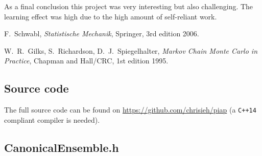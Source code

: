 \documentclass[11pt, a4paper]{article}
\numberwithin{equation}{section}
\begin{document}
As a final conclusion this project was very interesting but also challenging.
The learning effect was high due to the high amount of self-reliant work.

\FloatBarrier
\vspace{\fill}
\begin{thebibliography}{9}
	F.\ Schwabl,
	\emph{Statistische Mechanik},
	Springer, 3rd edition 2006.

	W.\ R.\ Gilks, S.\ Richardson, D.\ J.\ Spiegelhalter,
	\emph{Markov Chain Monte Carlo in Practice},
	Chapman and Hall/CRC, 1st edition 1995.
\end{thebibliography}

\begin{appendix}
	\newpage
	\section{Source code}
	The full source code can be found on \url{https://github.com/chrisieh/piap} (a \texttt{C++14} compliant compiler is needed).
	\subsection{CanonicalEnsemble{.}h} \label{sec:canonical_ensemble_source}
	
\end{appendix}
\end{document}

